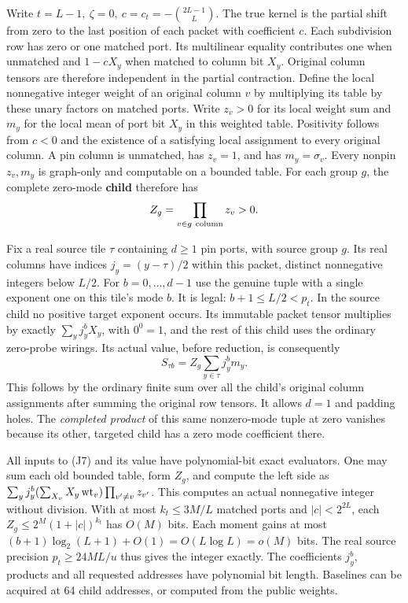 \documentclass[
  11pt,
]{article}
\begin{document}
Write \(t=L-1,\ \zeta=0,\ c=c_t=-\binom{2L-1}{L}\). The true kernel is
the partial shift from zero to the last position of each packet with
coefficient \(c\). Each subdivision row has zero or one matched port.
Its multilinear equality contributes one when unmatched and \(1-cX_y\)
when matched to column bit \(X_y\). Original column tensors are
therefore independent in the partial contraction. Define the local
nonnegative integer weight of an original column \(v\) by multiplying
its table by these unary factors on matched ports. Write \(z_v>0\) for
its local weight sum and \(m_y\) for the local mean of port bit \(X_y\)
in this weighted table. Positivity follows from \(c<0\) and the
existence of a satisfying local assignment to every original column. A
pin column is unmatched, has \(z_v=1\), and has \(m_y=\sigma_v\). Every
nonpin \(z_v,m_y\) is graph-only and computable on a bounded table. For
each group \(g\), the complete zero-mode \textbf{child} therefore has \[
                           Z_g=\prod_{v\in g\ {\rm column}}z_v>0.
\]

Fix a real source tile \(\tau\) containing \(d\ge1\) pin ports, with
source group \(g\). Its real columns have indices \(j_y=(y-\tau)/2\)
within this packet, distinct nonnegative integers below \(L/2\). For
\(b=0,\ldots,d-1\) use the genuine tuple with a single exponent one on
this tile's mode \(b\). It is legal: \(b+1\le L/2<p_t\). In the source
child no positive target exponent occurs. Its immutable packet tensor
multiplies by exactly \(\sum_y j_y^bX_y\), with \(0^0=1\), and the rest
of this child uses the ordinary zero-probe wirings. Its actual value,
before reduction, is consequently \[
                    S_{\tau b}=Z_g\sum_{y\in\tau} j_y^b m_y .              \tag{J7}
\] This follows by the ordinary finite sum over all the child's original
column assignments after summing the original row tensors. It allows
\(d=1\) and padding holes. The \emph{completed product} of this same
nonzero-mode tuple at zero vanishes because its other, targeted child
has a zero mode coefficient there.

All inputs to (J7) and its value have polynomial-bit exact evaluators.
One may sum each old bounded table, form \(Z_g\), and compute the left
side as
\(\sum_y j_y^b(\sum_{X_v} X_y\,{\rm wt}_v)\prod_{v'\ne v}z_{v'}\). This
computes an actual nonnegative integer without division. With at most
\(k_t\le3M/L\) matched ports and \(|c|<2^{2L}\), each
\(Z_g\le2^M(1+|c|)^{k_t}\) has \(O(M)\) bits. Each moment gains at most
\((b+1)\log_2(L+1)+O(1)=O(L\log L)=o(M)\) bits. The real source
precision \(p_t\ge24ML/u\) thus gives the integer exactly. The
coefficients \(j_y^b\), products and all requested addresses have
polynomial bit length. Baselines can be acquired at 64 child addresses,
or computed from the public weights.
\end{document}
